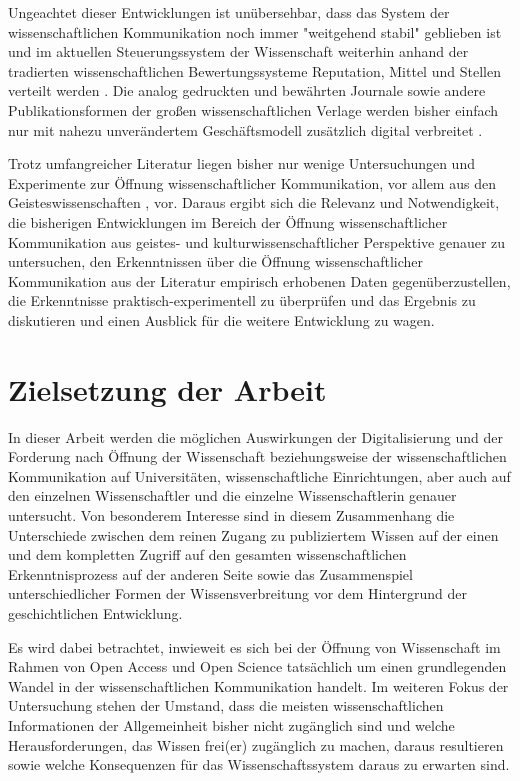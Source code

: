 Ungeachtet dieser Entwicklungen ist unübersehbar, dass das System der wissenschaftlichen Kommunikation noch immer "weitgehend stabil" \cite[:2]{Hanekop_2014} geblieben ist und im aktuellen Steuerungssystem der Wissenschaft weiterhin anhand der tradierten wissenschaftlichen Bewertungssysteme Reputation, Mittel und Stellen verteilt werden \cite{Hollricher_2009} \cite{de_Vries_2001}. Die analog gedruckten und bewährten Journale sowie andere Publikationsformen der großen wissenschaftlichen Verlage werden bisher einfach nur mit nahezu unverändertem Geschäftsmodell zusätzlich digital verbreitet \cite{Hanekop_2014} \cite{BOAI_2012}.

Trotz umfangreicher Literatur liegen bisher nur wenige Untersuchungen und Experimente zur Öffnung wissenschaftlicher Kommunikation, vor allem aus den Geisteswissenschaften \cite{Naeder_2010}, vor. Daraus ergibt sich die Relevanz und Notwendigkeit, die bisherigen Entwicklungen im Bereich der Öffnung wissenschaftlicher Kommunikation aus geistes- und kulturwissenschaftlicher Perspektive genauer zu untersuchen, den Erkenntnissen über die Öffnung wissenschaftlicher Kommunikation aus der Literatur empirisch erhobenen Daten gegenüberzustellen, die Erkenntnisse praktisch-experimentell zu überprüfen und das Ergebnis zu diskutieren und einen Ausblick für die weitere Entwicklung zu wagen.

\section{Zielsetzung der Arbeit}

In dieser Arbeit werden die möglichen Auswirkungen der Digitalisierung und der Forderung nach Öffnung der Wissenschaft beziehungsweise der wissenschaftlichen Kommunikation auf Universitäten, wissenschaftliche Einrichtungen, aber auch auf den einzelnen Wissenschaftler und die einzelne Wissenschaftlerin genauer untersucht. Von besonderem Interesse sind in diesem Zusammenhang die Unterschiede zwischen dem reinen Zugang zu publiziertem Wissen auf der einen und dem kompletten Zugriff auf den gesamten wissenschaftlichen Erkenntnisprozess auf der anderen Seite sowie das Zusammenspiel unterschiedlicher Formen der Wissensverbreitung vor dem Hintergrund der geschichtlichen Entwicklung.

Es wird dabei betrachtet, inwieweit es sich bei der Öffnung von Wissenschaft im Rahmen von Open Access und Open Science tatsächlich um einen grundlegenden Wandel in der wissenschaftlichen Kommunikation handelt. Im weiteren Fokus der Untersuchung stehen der Umstand, dass die meisten wissenschaftlichen Informationen der Allgemeinheit bisher nicht zugänglich sind und welche Herausforderungen, das Wissen frei(er) zugänglich zu machen, daraus resultieren sowie welche Konsequenzen für das Wissenschaftssystem daraus zu erwarten sind.

